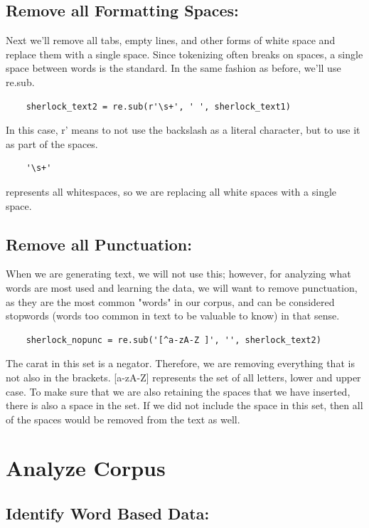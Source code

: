 \documentclass{article}
\begin{document}
\subsection{Remove all Formatting Spaces:}

Next we'll remove all tabs, empty lines, and other forms of white space and replace them with a single space. Since tokenizing often breaks on spaces, a single space between words is the standard. In the same fashion as before, we'll use re.sub.
\begin{verbatim}
    sherlock_text2 = re.sub(r'\s+', ' ', sherlock_text1)
\end{verbatim}
 In this case, r' means to not use the backslash as a literal character, but to use it as part of the spaces. 
 \begin{verbatim}
    '\s+'
 \end{verbatim}
 represents all whitespaces, so we are replacing all white spaces with a single space.
 
 \subsection{Remove all Punctuation:}
 
 When we are generating text, we will not use this; however, for analyzing what words are most used and learning the data, we will want to remove punctuation, as they are the most common "words" in our corpus, and can be considered stopwords (words too common in text to be valuable to know) in that sense. 
 \begin{verbatim}
    sherlock_nopunc = re.sub('[^a-zA-Z ]', '', sherlock_text2)
 \end{verbatim}
 The carat in this set is a negator. Therefore, we are removing everything that is not also in the brackets. [a-zA-Z] represents the set of all letters, lower and upper case. To make sure that we are also retaining the spaces that we have inserted, there is also a space in the set. If we did not include the space in this set, then all of the spaces would be removed from the text as well. 
 
 \section{Analyze Corpus}
 

 \subsection{Identify Word Based Data:}
 
\end{document}
